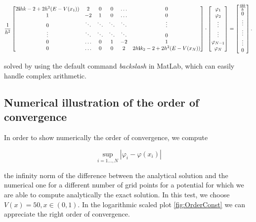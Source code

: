 \documentclass[12pt,a4paper,onecolumn]{article}
\theoremstyle{definition}
\theoremstyle{plain}
\newcommand{\var}{\varphi}
\renewcommand{\phi}{\varphi}
\begin{document}
\[
\frac{1}{h^2}
\begin{bmatrix}
2 \bold{i}hk-2+2h^2(E-V(x_1)) & 2 & 0 & 0 & \dots & 0 \\
1 & -2 & 1 & 0 & \dots & 0 \\
0 & \ddots & \ddots & \ddots & \ddots & \vdots \\
\vdots & \ddots & \ddots & \ddots & \ddots & 0 \\
0 & \dots & 0 & 1 & -2 & 1 \\
0 & \dots & 0 & 0 & 2 & 2 h \bold{i} k_2 - 2 +2 h^2 (E-V(x_N))
\end{bmatrix} 
\cdot
\begin{bmatrix}
\phi_1 \\
\phi_2 \\
\vdots \\
\vdots \\
\phi_{N-1} \\
\phi_N
\end{bmatrix}
=
\begin{bmatrix}
\frac{4 \bold{i}k}{h} \\
0 \\
\vdots \\
\vdots \\
\vdots \\
0
\end{bmatrix}.
\]

solved by using the default command \emph{backslash} in MatLab, which can easily handle complex arithmetic.





\subsection{Numerical illustration of the order of convergence}

In order to show numerically the order of convergence, we compute 

\[ 
\sup_{i=1 \ldots, N} |\var_i - \var(x_i)|
\]

 the infinity norm of the difference between the analytical solution and the numerical one for a different number of grid points for a potential for which we are able to compute analytically the exact solution. In this test, we choose $V(x)=50, x \in (0,1)$. In the logarithmic scaled plot  \ref {fig:OrderConst} we can appreciate the right order of convergence.
\end{document}
